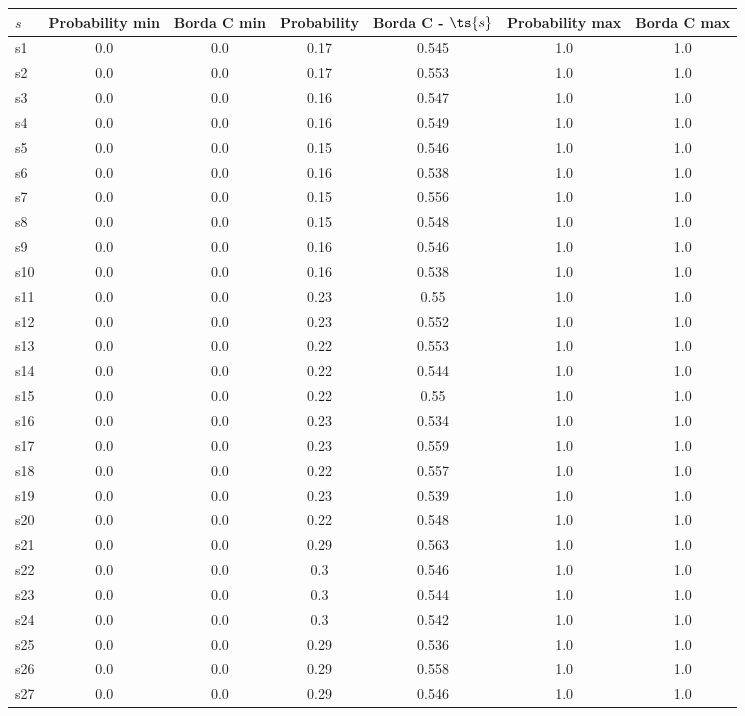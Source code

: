 \documentclass{article}
\begin{document}
\noindent\begin{tabular}{|l|c|c|c|c|c|c|}
\hline
$s$& Probability min & Borda C min & Probability & Borda C - $\ts{s}$ & Probability max & Borda C max\\
\hline
s1 &0.0 & 0.0 & 0.17 & 0.545 & 1.0 & 1.0\\
\hline
s2 &0.0 & 0.0 & 0.17 & 0.553 & 1.0 & 1.0\\
\hline
s3 &0.0 & 0.0 & 0.16 & 0.547 & 1.0 & 1.0\\
\hline
s4 &0.0 & 0.0 & 0.16 & 0.549 & 1.0 & 1.0\\
\hline
s5 &0.0 & 0.0 & 0.15 & 0.546 & 1.0 & 1.0\\
\hline
s6 &0.0 & 0.0 & 0.16 & 0.538 & 1.0 & 1.0\\
\hline
s7 &0.0 & 0.0 & 0.15 & 0.556 & 1.0 & 1.0\\
\hline
s8 &0.0 & 0.0 & 0.15 & 0.548 & 1.0 & 1.0\\
\hline
s9 &0.0 & 0.0 & 0.16 & 0.546 & 1.0 & 1.0\\
\hline
s10 &0.0 & 0.0 & 0.16 & 0.538 & 1.0 & 1.0\\
\hline
s11 &0.0 & 0.0 & 0.23 & 0.55 & 1.0 & 1.0\\
\hline
s12 &0.0 & 0.0 & 0.23 & 0.552 & 1.0 & 1.0\\
\hline
s13 &0.0 & 0.0 & 0.22 & 0.553 & 1.0 & 1.0\\
\hline
s14 &0.0 & 0.0 & 0.22 & 0.544 & 1.0 & 1.0\\
\hline
s15 &0.0 & 0.0 & 0.22 & 0.55 & 1.0 & 1.0\\
\hline
s16 &0.0 & 0.0 & 0.23 & 0.534 & 1.0 & 1.0\\
\hline
s17 &0.0 & 0.0 & 0.23 & 0.559 & 1.0 & 1.0\\
\hline
s18 &0.0 & 0.0 & 0.22 & 0.557 & 1.0 & 1.0\\
\hline
s19 &0.0 & 0.0 & 0.23 & 0.539 & 1.0 & 1.0\\
\hline
s20 &0.0 & 0.0 & 0.22 & 0.548 & 1.0 & 1.0\\
\hline
s21 &0.0 & 0.0 & 0.29 & 0.563 & 1.0 & 1.0\\
\hline
s22 &0.0 & 0.0 & 0.3 & 0.546 & 1.0 & 1.0\\
\hline
s23 &0.0 & 0.0 & 0.3 & 0.544 & 1.0 & 1.0\\
\hline
s24 &0.0 & 0.0 & 0.3 & 0.542 & 1.0 & 1.0\\
\hline
s25 &0.0 & 0.0 & 0.29 & 0.536 & 1.0 & 1.0\\
\hline
s26 &0.0 & 0.0 & 0.29 & 0.558 & 1.0 & 1.0\\
\hline
s27 &0.0 & 0.0 & 0.29 & 0.546 & 1.0 & 1.0\\

\end{tabular}
\end{document}
